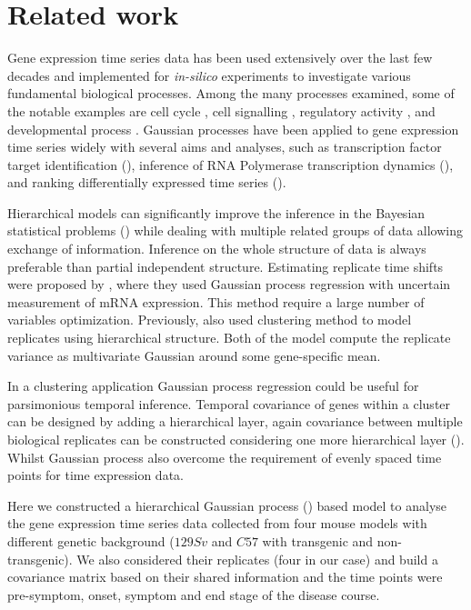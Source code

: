 \section{Related work}
Gene expression time series data has been used extensively over the last few decades and implemented for \textit {in-silico} experiments to investigate various fundamental biological processes. Among the many processes examined, some of the notable examples are cell cycle \cite{Spellman:1998}, cell signalling \cite{Barenco:2006}, regulatory activity \cite{Sanguinetti:2006}, and developmental process \cite{Tomancak:2002}. Gaussian processes have been applied to gene expression time series widely with several aims and analyses, such as transcription factor target identification (\cite{Honkela:2010}), inference of RNA Polymerase transcription dynamics (\cite{Maina:2014}), and ranking differentially expressed time series (\cite{Kalaitzis:2011}).

Hierarchical models can significantly improve the inference in the Bayesian statistical problems (\cite{Gelman:2004}) while dealing with multiple related groups of data allowing exchange of information. Inference on the whole structure of data is always preferable than partial independent structure. Estimating replicate time shifts were proposed by \cite{Liu:2010}, where they used Gaussian process regression with uncertain measurement of mRNA expression. This method require a large number of variables optimization. Previously, \cite{Ng:2006} also \cite{Medvedovic:2004} used clustering method to model replicates using hierarchical structure. Both of the model compute the replicate variance as multivariate Gaussian around some gene-specific mean.

In a clustering application Gaussian process regression could be useful for parsimonious temporal inference. Temporal covariance of genes within a cluster can be designed by adding a hierarchical layer, again covariance between multiple biological replicates can be constructed considering one more hierarchical layer (\cite{Menzefricke:2000, Hensman:2013}). Whilst Gaussian process also overcome the requirement of evenly spaced time points for time expression data.

Here we constructed a hierarchical Gaussian process (\cite{Hensman:2013}) based model to analyse the gene expression time series data collected from four mouse models with different genetic background ($129Sv$ and $C57$ with transgenic and non-transgenic). We also considered their replicates (four in our case) and build a covariance matrix based on their shared information and the time points were pre-symptom, onset, symptom and end stage of the disease course.


